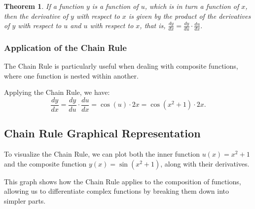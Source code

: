 \documentclass[a4paper,12pt]{book}
\newcounter{example}
\newtheorem{theorem}{Theorem}
\begin{document}
\begin{theorem}
If a function \( y \) is a function of \( u \), which is in turn a function of \( x \), then the derivative of \( y \) with respect to \( x \) is given by the product of the derivatives of \( y \) with respect to \( u \) and \( u \) with respect to \( x \), that is, \( \frac{dy}{dx} = \frac{dy}{du} \cdot \frac{du}{dx} \).
\end{theorem}

\subsubsection*{Application of the Chain Rule}
The Chain Rule is particularly useful when dealing with composite functions, where one function is nested within another.


Applying the Chain Rule, we have:
\[ \frac{dy}{dx} = \frac{dy}{du} \cdot \frac{du}{dx} = \cos(u) \cdot 2x = \cos(x^2 + 1) \cdot 2x. \]

\subsection{Chain Rule Graphical Representation}
To visualize the Chain Rule, we can plot both the inner function \( u(x) = x^2 + 1 \) and the composite function \( y(x) = \sin(x^2 + 1) \), along with their derivatives.

\begin{center}
\end{center}

This graph shows how the Chain Rule applies to the composition of functions, allowing us to differentiate complex functions by breaking them down into simpler parts.
\end{document}
